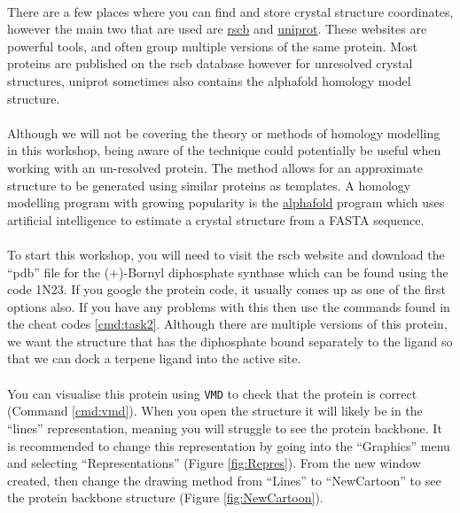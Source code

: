   \paragraph{}
  There are a few places where you can find and store crystal structure coordinates, however the main two that are used are \href{https://www.rcsb.org/}{rscb} and \href{https://www.uniprot.org/}{uniprot}. These websites are powerful tools, and often group multiple versions of the same protein. Most proteins are published on the rscb database however for unresolved crystal structures, uniprot sometimes also contains the alphafold\cite{Varadi2022AlphaFoldModels} homology model structure. 

  \paragraph{}
  Although we will not be covering the theory or methods of homology modelling in this workshop, being aware of the technique could potentially be useful when working with an un-resolved protein. The method allows for an approximate structure to be generated using similar proteins as templates. A homology modelling program with growing popularity is the \href{https://www.deepmind.com/research/highlighted-research/alphafold}{alphafold}\cite{Varadi2022AlphaFoldModels} program which uses artificial intelligence to estimate a crystal structure from a FASTA sequence.

  \paragraph{}
  To start this workshop, you will need to visit the rscb website and download the \enquote{pdb} file for the (+)-Bornyl diphosphate synthase which can be found using the code 1N23.  If you google the protein code, it usually comes up as one of the first options also. If you have any problems with this then use the commands found in the cheat codes \cref{cmd:task2}. Although there are multiple versions of this protein, we want the structure that has the diphosphate bound separately to the ligand so that we can dock a terpene ligand into the active site.

  \paragraph{}
  You can visualise this protein using \texttt{VMD} to check that the protein is correct (Command \ref{cmd:vmd}). When you open the structure it will likely be in the \enquote{lines} representation, meaning you will struggle to see the protein backbone. It is recommended to change this representation by going into the \enquote{Graphics} menu and selecting \enquote{Representations} (Figure \ref{fig:Repres}). From the new window created, then change the drawing method from \enquote{Lines} to \enquote{NewCartoon} to see the protein backbone structure (Figure \ref{fig:NewCartoon}).
    
